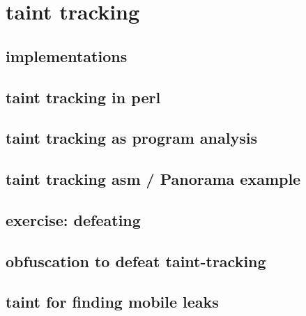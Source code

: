 \section{taint tracking}


\subsection{implementations}


\subsection{taint tracking in perl}


\subsection{taint tracking as program analysis}


\subsection{taint tracking asm / Panorama example}


\subsection{exercise: defeating} 


\subsection{obfuscation to defeat taint-tracking}


\subsection{taint for finding mobile leaks}

